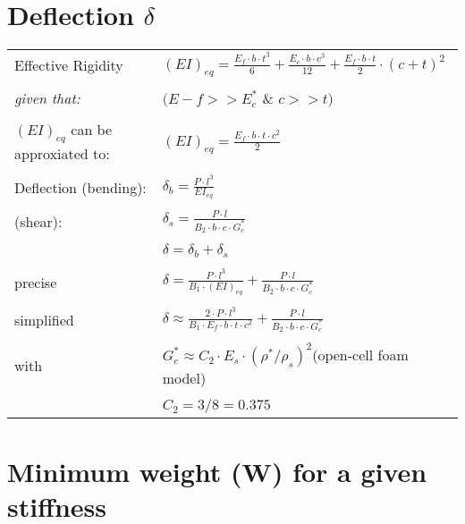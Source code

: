 \documentclass[12pt]{article}
\begin{document}
\section{Deflection $\delta$}
\begin{tabular}{l l}
Effective Rigidity&\Large $(EI)_{eq}=
 \frac{E_f \cdot b \cdot t^3}{6}  +
 \frac{E_c \cdot b \cdot c^3}{12}  +
 \frac{E_f \cdot b \cdot t}{2}  \cdot  (c+t)^2$\\
\\
\textit{given that:} & \normalsize $(E-f>>E^*_c$ \& $c>>t)$\\
\\
$(EI)_{eq}$ can be approxiated to: & \Large $(EI)_{eq}=
  \frac{E_f \cdot b \cdot t \cdot c^2} {2}$\\
\\
Deflection (bending): &\Large$\delta_b=\frac{P\cdot l^3}{EI_{eq}}$\\
\\
\hspace{2cm}(shear):&\Large$\delta_s=\frac{P\cdot l}{B_2\cdot b \cdot c \cdot G^*_c}$\\
\\
&\Large$\delta=\delta_b + \delta_s$\\
\\
\hspace{3cm}precise&\Large$\delta=\frac{P\cdot l^3}{B_1\cdot (EI)_{eq}} + \frac{P\cdot l}{B_2 \cdot b \cdot c \cdot G^*_c }$\\
\\
\hspace{3cm}simplified& \Large $\delta\approx \frac{2\cdot P \cdot l^3}{B_1 \cdot E_f \cdot b \cdot t \cdot c^2} +
		\frac{P\cdot l}{B_2 \cdot b \cdot c \cdot G^*_c }$\\
\\
with & \Large $G^*_c \approx C_2 \cdot E_s \cdot (\rho^*/\rho_s)^2$\normalsize  \hspace{1cm}(open-cell foam model) \\
\\
&\Large $C_2 = 3/8 = 0.375$ \\
\end{tabular}
\vspace{3cm}
\section{Minimum weight (W) for a given stiffness}
\vspace{0.5cm}
\end{document}
